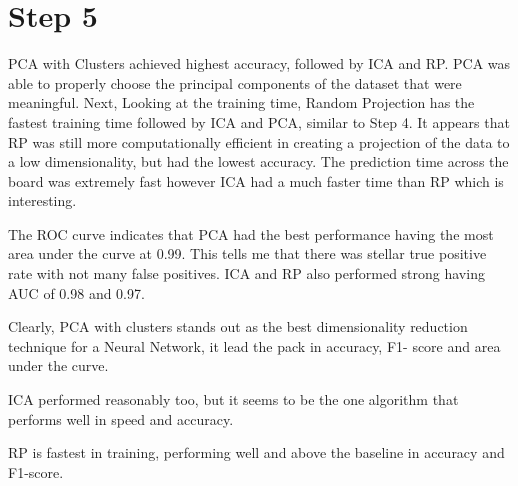 \documentclass[conference]{IEEEtran}
\begin{document}
\section{Step 5}
\par PCA with Clusters achieved highest accuracy, followed by ICA and RP. PCA was able to properly choose the principal components of the dataset that were meaningful. Next, Looking at the training time, Random Projection has the fastest training time followed by ICA and PCA, similar to Step 4. It appears that RP was still more computationally efficient in creating a projection of the data to a low dimensionality, but had the lowest accuracy. The prediction time across the board was extremely fast however ICA had a much faster time than RP which is interesting. 
\par The ROC curve indicates that PCA had the best performance having the most area under the curve at 0.99. This tells me that there was stellar true positive rate with not many false positives. ICA and RP also performed strong having AUC of 0.98 and 0.97. 
\par Clearly, PCA with clusters stands out as the best dimensionality reduction technique for a Neural Network, it lead the pack in accuracy, F1- score and area under the curve.
\par ICA performed reasonably too, but it seems to be the one algorithm that performs well in speed and accuracy.
\par RP is fastest in training, performing well and above the baseline in accuracy and F1-score.
\begin{table}[htp]
    \centering
        \caption{Performance comparison of PCA, ICA, and RP with clusters.}
    \label{tab:performance_comparison}
      \resizebox{\columnwidth}{!}{%
    \begin{tabular}{lcccc}
        \toprule
         \textbf{Method} & \textbf{Accuracy} & \textbf{Training Time (s)} & \textbf{Prediction Time (s)} & \textbf{F1-Score Avg} \\
        \midrule
        \textbf{PCA w/ Clusters} & 0.9454 & 3.6799 & 0.00038 & 0.95\\
        \textbf{ICA w/ Clusters} & 0.9369 & 3.55548 & 0.00029 & 0.94\\
        \textbf{RP w/ Clusters} & 0.9300 & 2.15453 & 0.00033 & 0.93\\
        \bottomrule
        
    \end{tabular}%
    }

\end{table}
\end{document}
